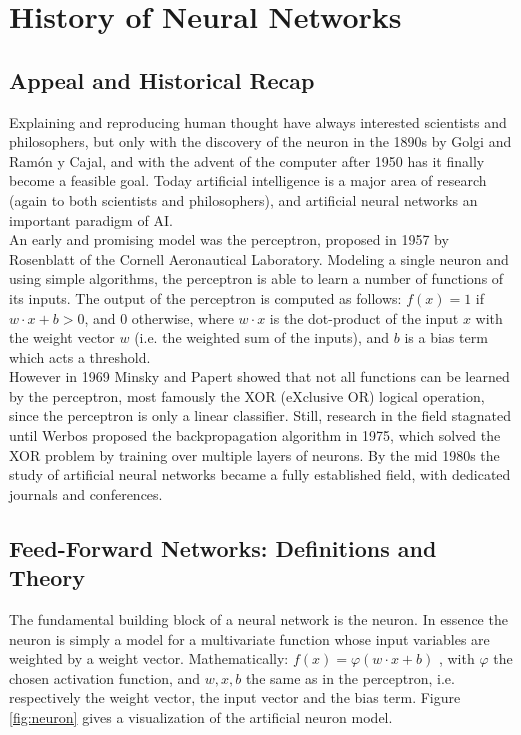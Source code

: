 \documentclass[12pt,oneside]{CUNY_CS_PhD}
\begin{document}
\tableofcontents

\mainmatter

\chapter{History of Neural Networks}
\section{Appeal and Historical Recap}
Explaining and reproducing human thought have always interested scientists and philosophers, but only with the discovery of the neuron in the 1890s by Golgi and Ram\'{o}n y Cajal, and with the advent of the computer after 1950 has it finally become a feasible goal. Today artificial intelligence is a major area of research (again to both scientists and philosophers), and artificial neural networks an important paradigm of AI.\\
An early and promising model was the perceptron, proposed in 1957 by Rosenblatt \cite{rosenblatt_perceptron_1957} of the Cornell Aeronautical Laboratory. Modeling a single neuron and using simple algorithms, the perceptron is able to learn a number of functions of its inputs. The output of the perceptron is computed as follows: $f(x) = 1$ if $w \cdot x + b>0$, and $0$ otherwise, where $w \cdot x$ is the dot-product of the input $x$ with the weight vector $w$ (i.e. the weighted sum of the inputs), and $b$ is a bias term which acts a threshold.\\
However in 1969 Minsky and Papert \cite{minsky_perceptrons_1969} showed that not all functions can be learned by the perceptron, most famously the XOR (eXclusive OR) logical operation, since the perceptron is only a linear classifier. Still, research in the field stagnated until Werbos proposed the backpropagation algorithm in 1975, which solved the XOR problem by training over multiple layers of neurons. By the mid 1980s the study of artificial neural networks became a fully established field, with dedicated journals and conferences.


\section{Feed-Forward Networks: Definitions and Theory}
The fundamental building block of a neural network is the neuron. In essence the neuron is simply a model for a multivariate function whose input variables are weighted by a weight vector. Mathematically: $f(x) = \varphi(w \cdot x +b)$ , with $\varphi$ the chosen activation function, and $w,x,b$ the same as in the perceptron, i.e. respectively the weight vector, the input vector and the bias term. Figure \ref{fig:neuron} gives a visualization of the artificial neuron model.\\
\end{document}
